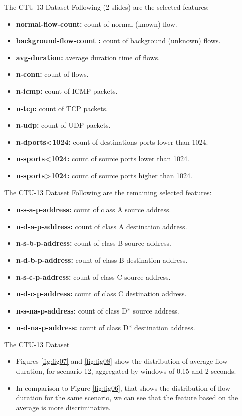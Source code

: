 \documentclass[newPxFont, numfooter, sectionpages]{beamer}
\begin{document}
\begin{frame}[c]{The CTU-13 Dataset}
	Following (2 slides) are the selected features:
	\begin{itemize}
		\item \textbf{normal-flow-count:} count of normal (known) flow.
		\item \textbf{background-flow-count :} count of background (unknown) flows.
		\item \textbf{avg-duration:} average duration time of flows.
		\item \textbf{n-conn:} count of flows.
		\item \textbf{n-icmp:} count of ICMP packets.
		\item \textbf{n-tcp:} count of TCP packets.
		\item \textbf{n-udp:} count of UDP packets.
		\item \textbf{n-dports<1024:} count of destinations ports lower than 1024.
		\item \textbf{n-sports<1024:} count of source ports lower than 1024.
		\item \textbf{n-sports>1024:} count of source ports higher than 1024.
	\end{itemize}
\end{frame}

\begin{frame}[c]{The CTU-13 Dataset}
	Following are the remaining selected features:
	\begin{itemize}
		\item \textbf{n-s-a-p-address:} count of class A source address.
		\item \textbf{n-d-a-p-address:} count of class A destination address.
		\item \textbf{n-s-b-p-address:} count of class B source address.
		\item \textbf{n-d-b-p-address:} count of class B destination address.
		\item \textbf{n-s-c-p-address:} count of class C source address.
		\item \textbf{n-d-c-p-address:} count of class C destination address.
		\item \textbf{n-s-na-p-address:} count of class D* source address.
		\item \textbf{n-d-na-p-address:} count of class D* destination address.
	\end{itemize}
\end{frame}

\begin{frame}[c]{The CTU-13 Dataset}
	\begin{itemize}
		\item Figures \ref{fig:fig07} and \ref{fig:fig08} show the distribution of average flow duration, for scenario 12, aggregated by windows of 0.15 and 2 seconds.
		\item In comparison to Figure \ref{fig:fig06}, that shows the distribution of flow duration for the same scenario, we can see that the feature based on the average is more discriminative.
	\end{itemize}
\end{frame}
\end{document}
